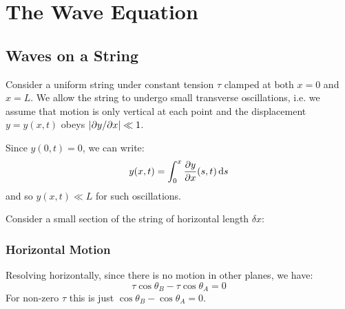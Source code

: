 \documentclass[../main.tex]{subfiles}
\begin{document}
\section{The Wave Equation} \label{waveEqnSec}
\subsection{Waves on a String}
Consider a uniform string under constant tension $\tau$ clamped at both $x = 0$ and $x = L$.
We allow the string to undergo small transverse oscillations, i.e. we assume that motion is only vertical at each point and the displacement $y = y(x, t)$ obeys $\left\lvert \partial y/\partial x \right\rvert \ll 1$.
\begin{remark}
  Since $y(0, t) = 0$, we can write:
  \[
    y(x, t) = \int_{0}^{x} \pderiv{y}{x}(s, t) \d{s}
  \]
  and so $y(x, t) \ll L$ for such oscillations.
\end{remark}
Consider a small section of the string of horizontal length $\delta x$:
\begin{center}
\end{center}
\subsubsection{Horizontal Motion}
Resolving horizontally, since there is no motion in other planes, we have:
\[
  \tau \cos \theta_B - \tau \cos \theta_A = 0
\]
For non-zero $\tau$ this is just $\cos \theta_B - \cos \theta_A = 0$.
\end{document}
